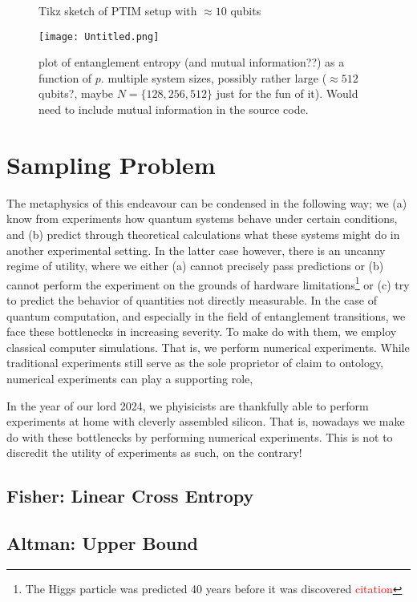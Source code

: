 \begin{figure}[t]
  \centering
  
  \caption{Tikz sketch of PTIM setup with $\approx 10$ qubits}
  \label{fig:ptim-circuit}
\end{figure}

\begin{figure}[H]
  \centering
  \texttt{[image: Untitled.png]}
  \caption{plot of entanglement entropy (and mutual information??) as a
  function of $p$. multiple system sizes, possibly rather large ($\approx 512$
qubits?, maybe $N=\{128,256,512\}$ just for the fun of it). Would need to
include mutual information in the source code.}
  \label{fig:phase-transition}
\end{figure}

\section{Sampling Problem}\label{sec:sampling}
The metaphysics of this endeavour can
be condensed in the following way; we (a) know from experiments how quantum
systems behave under certain conditions, and (b) predict through theoretical
calculations what these systems might do in another experimental setting. In
the latter case however, there is an uncanny regime of utility, where we either
(a) cannot precisely pass predictions or (b) cannot perform the experiment on
the grounds of hardware limitations\footnote{The Higgs particle was predicted
40 years before it was discovered \textcolor{red}{citation}} or (c) try to
predict the behavior of quantities not directly measurable. In the case of
quantum computation, and especially in the field of entanglement transitions,
we face these bottlenecks in increasing severity. To make do with them, we
employ classical computer simulations. That is, we perform numerical
experiments. While traditional experiments still serve as the sole proprietor of claim to
ontology, numerical experiments can play a supporting role, 

In the year of our
lord 2024, we phyisicists are thankfully able to perform experiments at home
with cleverly assembled silicon.  That is, nowadays we make do with these
bottlenecks by performing numerical experiments. This is not to discredit the
utility of experiments as such, on the contrary! 

\subsection{Fisher: Linear Cross Entropy}
\cite{liCrossEntropyBenchmark2023}

\subsection{Altman: Upper Bound}
\cite{garrattProbingPostmeasurementEntanglement2024}
